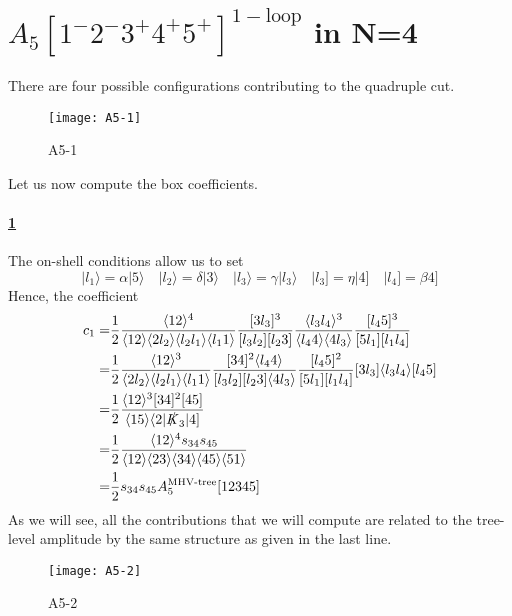 \section{$A_5[1^-2^-3^+4^+5^+]^{\mathrm{1-loop}}$ in N=4}
There are four possible configurations contributing to the quadruple cut.
\begin{figure}[h!]
  \centering
    \texttt{[image: A5-1]}
    \caption{A5-1}
  \label{A5-1}
\end{figure}
Let us now compute the box coefficients.
%
\paragraph{\ref{A5-1}}
The on-shell conditions allow us to set
\begin{equation*}
|l_1\rangle = \alpha |5\rangle \quad
|l_2\rangle = \delta |3\rangle \quad
|l_3\rangle = \gamma |l_3\rangle\quad
|l_3] = \eta|4]\quad
|l_4] = \beta 4]
\end{equation*}
Hence, the coefficient
\begin{equation*}
\begin{split}
c_1 = &
\frac{1}{2}\frac{\langle 12 \rangle^4}{\langle 1 2 \rangle \langle 2 l_2\rangle \langle l_2 l_1 \rangle\langle l_1 1 \rangle}
\frac{[3l_3]^3}{[l_3 l_2][l_2 3]}
\frac{\langle l_3 l_4 \rangle^{3}}{\langle l_4 4 \rangle \langle 4 l_3\rangle}
\frac{[l_4 5 ]^3}{[5l_1][l_1 l_4]}
\\
= & 
\frac{1}{2}\frac{\langle 12 \rangle^3}{\langle 2 l_2 \rangle\langle l_2 l_1 \rangle\langle l_1 1\rangle}
\frac{[34]^2\langle l_4 4\rangle}{[l_3 l_2][l_2 3]\langle 4 l_3\rangle}
\frac{[l_4 5]^2}{[5l_1 ][l_1 l_4]}
[3 l_3]\langle l_3 l_4 \rangle [l_4 5]
\\
= &
\frac{1}{2}
\frac{\langle 12 \rangle^3[34]^2[45]}{\langle 15 \rangle\langle2|\slashed{K}_{3}|4]}
\\
= &
\frac{1}{2}\frac{\langle 12 \rangle^4 s_{34}s_{45}}{\langle 12 \rangle\langle 23 \rangle \langle 34\rangle \langle 45\rangle \langle 51\rangle}
\\
= &
\frac{1}{2}s_{34}s_{45}A_5^{\textrm{MHV-tree}}[12345]
\end{split}
\end{equation*}
As we will see, all the contributions that we will compute are related to the tree-level amplitude by the same structure as given in the last line.   
%
%
%
%
\iffalse
\begin{figure}[h!]
  \centering
    \texttt{[image: A5-2]}
    \caption{A5-2}
  \label{A5-2}
\end{figure}
